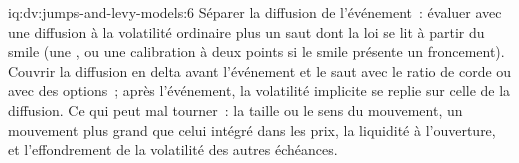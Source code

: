 \begin{solution}{iq:dv:jumps-and-levy-models:6}
Séparer la diffusion de l'événement~: évaluer avec une diffusion à la volatilité ordinaire plus un saut dont la loi se lit
à partir du smile (une , ou une calibration à deux points si le smile présente un froncement). Couvrir la diffusion en delta
avant l'événement et le saut avec le ratio de corde ou avec des options~; après l'événement, la volatilité implicite se replie
sur celle de la diffusion. Ce qui peut mal tourner~: la taille ou le sens du mouvement, un mouvement plus grand que celui intégré dans les prix, la liquidité à l'ouverture,
et l'effondrement de la volatilité des autres échéances.
\end{solution}
